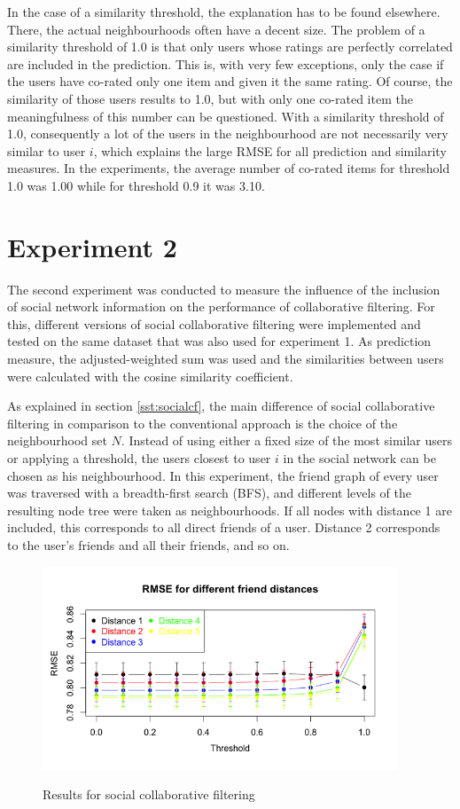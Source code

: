 In the case of a similarity threshold, the explanation has to be found elsewhere. There, the actual neighbourhoods often have a decent size. The problem of a similarity threshold of 1.0 is that only users whose ratings are perfectly correlated are included in the prediction. This is, with very few exceptions, only the case if the users have co-rated only one item and given it the same rating. Of course, the similarity of those users results to 1.0, but with only one co-rated item the meaningfulness of this number can be questioned. With a similarity threshold of 1.0, consequently a lot of the users in the neighbourhood are not necessarily very similar to user $i$, which explains the large RMSE for all prediction and similarity measures. In the experiments, the average number of co-rated items for threshold 1.0 was 1.00 while for threshold 0.9 it was 3.10.
\section{Experiment 2}
\label{st:experiment2} The second experiment was conducted to measure the influence of the inclusion of social network information on the performance of collaborative filtering. For this, different versions of social collaborative filtering were implemented and tested on the same dataset that was also used for experiment 1. As prediction measure, the adjusted-weighted sum was used and the similarities between users were calculated with the cosine similarity coefficient.

As explained in section \ref{sst:socialcf}, the main difference of social collaborative filtering in comparison to the conventional approach is the choice of the neighbourhood set $N$. Instead of using either a fixed size of the most similar users or applying a threshold, the users closest to user $i$ in the social network can be chosen as his neighbourhood. In this experiment, the friend graph of every user was traversed with a breadth-first search (BFS), and different levels of the resulting node tree were taken as neighbourhoods. If all nodes with distance 1 are included, this corresponds to all direct friends of a user. Distance 2 corresponds to the user's friends and all their friends, and so on.

\begin{figure}[!ht]
\includegraphics[width=400px]{./4-experiments/figures/SOCIALUSERBASED_V2.png}
\label{f:socialuserbased}
\caption{Results for social collaborative filtering}
\end{figure}

